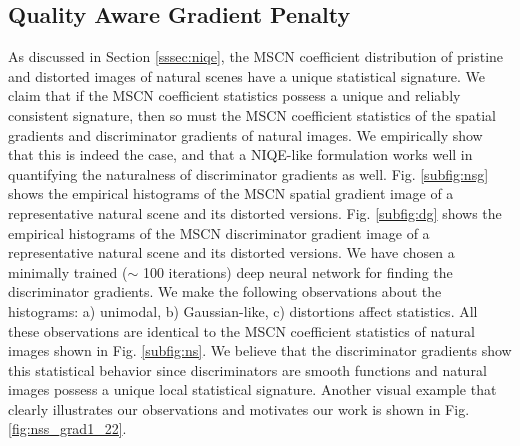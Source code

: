 \documentclass{article}
\begin{document}
\subsection{Quality Aware Gradient Penalty}\label{ssec:qagp}
As discussed in Section \ref{sssec:niqe}, the MSCN coefficient distribution of pristine and distorted images of natural scenes have a unique statistical signature. We claim that if the MSCN coefficient statistics possess a unique and reliably consistent signature, then so must the MSCN coefficient statistics of the spatial gradients and discriminator gradients of natural images. We empirically show that this is indeed the case, and that a NIQE-like formulation works well in quantifying the naturalness of discriminator gradients as well.
Fig. \ref{subfig:nsg} shows the empirical histograms of the MSCN spatial gradient image of a representative natural scene and its distorted versions. Fig. \ref{subfig:dg} shows the empirical 
histograms of the MSCN discriminator gradient image of a representative natural scene and its distorted versions. We have chosen a minimally trained ($\sim$ 100 iterations) deep neural network for finding the discriminator gradients.
We make the following observations about the histograms: a) unimodal, b) Gaussian-like, c) distortions affect statistics. All these observations are identical to the MSCN coefficient statistics of natural images shown in Fig. \ref{subfig:ns}. We believe that the discriminator gradients show this statistical behavior since discriminators are smooth functions and natural images possess a unique local statistical signature. Another visual example that clearly illustrates our observations and motivates our work is shown in Fig. \ref{fig:nss_grad1_22}. 
\end{document}
